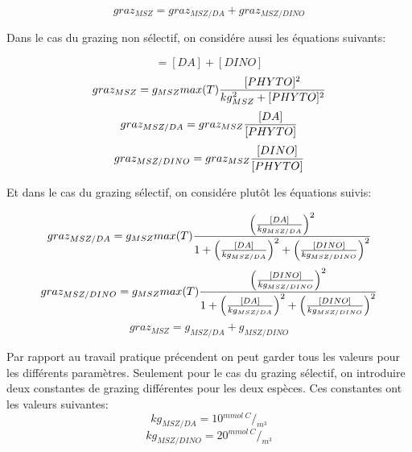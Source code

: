 \begin{equation}
  graz_{MSZ} = graz_{MSZ/DA} + graz_{MSZ/DINO}
  \label{eq:partie2grazMsz}
\end{equation}

\par{
Dans le cas du grazing non sélectif, on considére aussi les équations suivants:
}

\begin{equation}
  [PHYTO] = [DA] + [DINO]
  \label{eq:partie2nonSelEq1}
\end{equation}
\begin{equation}
  graz_{MSZ} = g_{MSZ} max(T) {{[PHYTO]^2}\over{kg_{MSZ}^2 + [PHYTO]^2}}
  \label{eq:partie2nonSelEq2}  
\end{equation}
\begin{equation}
  graz_{MSZ/DA} = graz_{MSZ} {{[DA]}\over{[PHYTO]}}
  \label{eq:partie2nonSelEq2}
\end{equation}
\begin{equation}
  graz_{MSZ/DINO} = graz_{MSZ} {{[DINO]}\over{[PHYTO]}}
  \label{eq:partie2nonSelEq3}
\end{equation}

\par{
Et dans le cas du grazing sélectif, on considére plutôt les équations suivis:
}

\begin{equation}
  graz_{MSZ/DA} = g_{MSZ} max(T) {{\left ( {{[DA]}\over{kg_{MSZ/DA}}}\right )^2}\over
{1 + \left ( {{[DA]}\over{kg_{MSZ/DA}}} \right )^2 + \left ( {{[DINO]}\over{kg_{MSZ/DINO}}} \right )^2}}
  \label{eq:partie2selEq1}
\end{equation}
\begin{equation}
  graz_{MSZ/DINO} = g_{MSZ} max(T) {{\left ( {{[DINO]}\over{kg_{MSZ/DINO}}}\right )^2}\over
{1 + \left ( {{[DA]}\over{kg_{MSZ/DA}}} \right )^2 + \left ( {{[DINO]}\over{kg_{MSZ/DINO}}} \right )^2}}
  \label{eq:partie2selEq2}
\end{equation}
\begin{equation}
  graz_{MSZ} = g_{MSZ/DA} + g_{MSZ/DINO}
  \label{eq:partie2selEq3}
\end{equation}

\par{
Par rapport au travail pratique précendent on peut garder tous les valeurs pour les différents paramètres.
Seulement pour le cas du grazing sélectif, on introduire deux constantes de grazing différentes pour les
deux espèces. Ces constantes ont les valeurs suivantes:
}
\[
kg_{MSZ/DA} = 10 {^{mmol~C}/_{m^3}}
\]
\[
kg_{MSZ/DINO} = 20 {^{mmol~C}/_{m^3}}
\]

